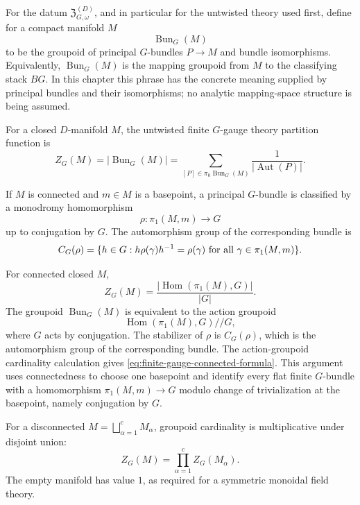 For the datum \(\mathfrak Z_{G,\omega}^{(D)}\), and in particular for the
untwisted theory used first, define for a compact manifold \(M\)
\[
  \operatorname{Bun}_G(M)
\]
to be the groupoid of principal \(G\)-bundles \(P\to M\) and bundle
isomorphisms.  Equivalently,
\(\operatorname{Bun}_G(M)\) is the mapping groupoid from \(M\) to the
classifying stack \(BG\).  In this chapter this phrase has the concrete
meaning supplied by principal bundles and their isomorphisms; no analytic
mapping-space structure is being assumed.

\begin{definition}
\label{def:untwisted-finite-gauge-partition}
For a closed \(D\)-manifold \(M\), the untwisted finite \(G\)-gauge theory
partition function is
\begin{equation}
  Z_G(M)
  =
  |\operatorname{Bun}_G(M)|
  =
  \sum_{[P]\in\pi_0\operatorname{Bun}_G(M)}
  \frac{1}{|\operatorname{Aut}(P)|}.
  \label{eq:untwisted-finite-gauge-partition}
\end{equation}
\end{definition}

If \(M\) is connected and \(m\in M\) is a basepoint, a principal
\(G\)-bundle is classified by a monodromy homomorphism
\[
  \rho:\pi_1(M,m)\to G
\]
up to conjugation by \(G\).  The automorphism group of the corresponding
bundle is
\[
  C_G(\rho)
  =
  \{h\in G: h\rho(\gamma)h^{-1}=\rho(\gamma)
  \ \hbox{for all }\gamma\in\pi_1(M,m)\}.
\]

For connected closed \(M\),
\begin{equation}
  Z_G(M)
  =
  \frac{|\operatorname{Hom}(\pi_1(M),G)|}{|G|}.
  \label{eq:finite-gauge-connected-formula}
\end{equation}
The groupoid \(\operatorname{Bun}_G(M)\) is equivalent to the action groupoid
\[
  \operatorname{Hom}(\pi_1(M),G)//G,
\]
where \(G\) acts by conjugation.  The stabilizer of \(\rho\) is
\(C_G(\rho)\), which is the automorphism group of the corresponding bundle.
The action-groupoid cardinality calculation gives
\eqref{eq:finite-gauge-connected-formula}.
This argument uses connectedness to choose one basepoint and identify every
flat finite \(G\)-bundle with a homomorphism \(\pi_1(M,m)\to G\) modulo
change of trivialization at the basepoint, namely conjugation by \(G\).

For a disconnected \(M=\bigsqcup_{\alpha=1}^c M_\alpha\), groupoid
cardinality is multiplicative under disjoint union:
\[
  Z_G(M)
  =
  \prod_{\alpha=1}^c Z_G(M_\alpha).
\]
The empty manifold has value \(1\), as required for a symmetric monoidal
field theory.

